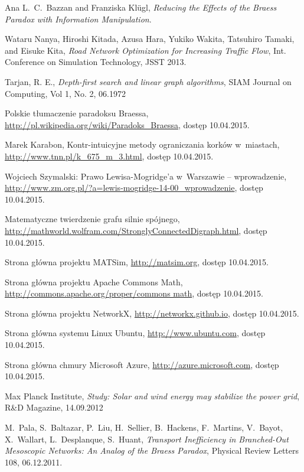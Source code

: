 \documentclass[twoside,12pt]{report}
\begin{document}
\begin{thebibliography}{99}
	Ana L.~C.~Bazzan and Franziska Klügl,
	\textit{Reducing the Effects of the Braess Paradox with Information Manipulation}.

	Wataru Nanya, Hiroshi Kitada, Azusa Hara, Yukiko Wakita, Tatsuhiro Tamaki, and Eisuke Kita,
	\textit{Road Network Optimization for Increasing Traffic Flow},
	Int. Conference on Simulation Technology, JSST 2013.

	Tarjan, R. E.,
	\textit{Depth-first search and linear graph algorithms},
	SIAM Journal on Computing, Vol 1, No. 2, 06.1972
	
	Polskie tłumaczenie paradoksu Braessa,
	\url{http://pl.wikipedia.org/wiki/Paradoks_Braessa},
	dostęp 10.04.2015.
	
	Marek Karabon, Kontr-intuicyjne metody ograniczania korków w~miastach,
	\url{http://www.tnn.pl/k_675_m_3.html},
	dostęp 10.04.2015.
	
	Wojciech Szymalski: Prawo Lewisa-Mogridge’a w~Warszawie – wprowadzenie,
	\url{http://www.zm.org.pl/?a=lewis-mogridge-14-00_wprowadzenie},
	dostęp 10.04.2015.
	   
	Matematyczne twierdzenie grafu silnie spójnego,
	\url{http://mathworld.wolfram.com/StronglyConnectedDigraph.html},
	dostęp 10.04.2015.	

	Strona główna projektu MATSim,
	\url{http://matsim.org},
	dostęp 10.04.2015.

	Strona główna projektu Apache Commons Math,
	\url{http://commons.apache.org/proper/commons math},
	dostęp 10.04.2015.
	
	Strona główna projektu NetworkX,
	\url{http://networkx.github.io},
	dostęp 10.04.2015.
	
	Strona główna systemu Linux Ubuntu,
	\url{http://www.ubuntu.com},
	dostęp 10.04.2015.
	
	Strona główna chmury Microsoft Azure,
	\url{http://azure.microsoft.com},
	dostęp 10.04.2015.
		
	Max Planck Institute, 
	\textit{Study: Solar and wind energy may stabilize the power grid},
	R\&D Magazine, 14.09.2012	

	M.~Pala, S.~Baltazar, P.~Liu, H.~Sellier, B.~Hackens, F.~Martins, V.~Bayot, X.~Wallart, L.~Desplanque, S.~Huant,
	\textit{Transport Inefficiency in Branched-Out Mesoscopic Networks: An Analog of the Braess Paradox},
	Physical Review Letters 108, 06.12.2011.

\end{thebibliography}
\end{document}
